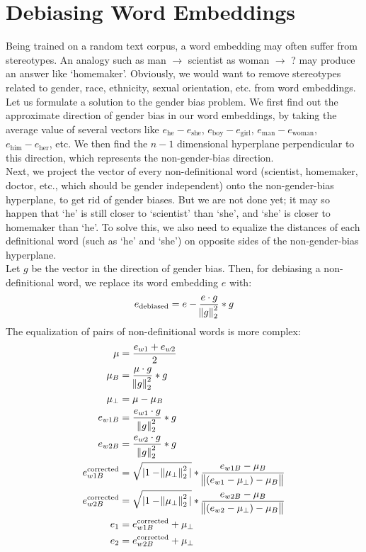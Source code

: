 \documentclass[a4paper, 12pt]{report}
\begin{document}
\section{Debiasing Word Embeddings}
Being trained on a random text corpus, a word embedding may often suffer from stereotypes. An analogy such as man $\rightarrow$ scientist as woman $\rightarrow$ ? may produce an answer like `homemaker'. Obviously, we would want to remove stereotypes related to gender, race, ethnicity, sexual orientation, etc. from word embeddings.\\
\break
Let us formulate a solution to the gender bias problem. We first find out the approximate direction of gender bias in our word embeddings, by taking the average value of several vectors like $e_{\text{he}}-e_{\text{she}}$, $e_{\text{boy}}-e_{\text{girl}}$, $e_{\text{man}}-e_{\text{woman}}$, $e_{\text{him}}-e_{\text{her}}$, etc. We then find the $n-1$ dimensional hyperplane perpendicular to this direction, which represents the non-gender-bias direction.\\
\break
Next, we project the vector of every non-definitional word (scientist, homemaker, doctor, etc., which should be gender independent) onto the non-gender-bias hyperplane, to get rid of gender biases. But we are not done yet; it may so happen that `he' is still closer to `scientist' than `she', and `she' is closer to homemaker than `he'. To solve this, we also need to equalize the distances of each definitional word (such as `he' and `she') on opposite sides of the non-gender-bias hyperplane.\\
\break
Let $g$ be the vector in the direction of gender bias. Then, for debiasing a non-definitional word, we replace its word embedding $e$ with:
\begin{align*}
e_{\text{debiased}} = e - \dfrac{e\cdot g}{\norm{g}_2^2}*g
\end{align*}
The equalization of pairs of non-definitional words is more complex:
\begin{align*}
\mu &= \dfrac{e_{w1}+e_{w2}}{2}\\
\mu_B &= \dfrac{\mu\cdot g}{\norm{g}_2^2}*g\\
\mu_{\perp} &= \mu - \mu_B\\
e_{w1B} &= \dfrac{e_{w1}\cdot g}{\norm{g}_2^2}*g\\
e_{w2B} &= \dfrac{e_{w2}\cdot g}{\norm{g}_2^2}*g\\
e_{w1B}^{\text{corrected}} &= \sqrt{|1-\norm{\mu_\perp}_2^2|} * \dfrac{e_{w1B}-\mu_B}{\norm{(e_{w1}-\mu_\perp)-\mu_B}}\\
e_{w2B}^{\text{corrected}} &= \sqrt{|1-\norm{\mu_\perp}_2^2|} * \dfrac{e_{w2B}-\mu_B}{\norm{(e_{w2}-\mu_\perp)-\mu_B}}\\
e_1 &= e_{w1B}^{\text{corrected}}+\mu_\perp\\
e_2 &= e_{w2B}^{\text{corrected}}+\mu_\perp
\end{align*}
\end{document}
